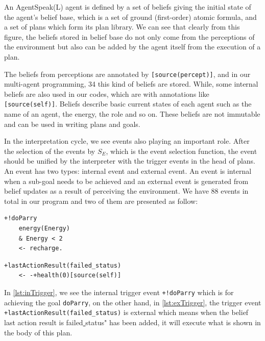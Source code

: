 An AgentSpeak(L) agent is defined by a set of beliefs giving the initial state of the agent's belief base, which is a set of ground (first-order) atomic formula, and a set of plans which form its plan library\cite{rafael_BDIAgent_2005}. We can see that clearly from this figure, the beliefs stored in belief base do not only come from the perceptions of the environment but also can be added by the agent itself from the execution of a plan.

The beliefs from perceptions are annotated by \texttt{[source(percept)]}, and in our multi-agent programming, 34 this kind of beliefs are stored. While, some internal beliefs are also used in our codes, which are with annotations like \texttt{[source(self)]}. Beliefs describe basic current states of each agent such as the name of an agent, the energy, the role and so on. These beliefs are not immutable and can be used in writing plans and goals.

In the interpretation cycle, we see events also playing an important role. After the selection of the events by $S_E$, which is the event selection function, the event should be unified by the interpreter with the trigger events in the head of plans. An event has two types: internal event and external event. An event is internal when a sub-goal needs to be achieved and an external event is generated from belief updates as a result of perceiving the environment. We have 88 events in total in our program and two of them are presented as follow:

\begin{lstlisting}[caption={Internal Trigger Event.},label={lst:inTrigger}]
  +!doParry
    energy(Energy)
    & Energy < 2
    <- recharge.
\end{lstlisting}

\begin{lstlisting}[caption={External Trigger Event.},label={lst:exTrigger}]
  +lastActionResult(failed_status)
    <- -+health(0)[source(self)]
\end{lstlisting}

In \autoref{lst:inTrigger}, we see the internal trigger event \texttt{+!doParry} which is for achieving the goal \texttt{doParry}, on the other hand, in \autoref{lst:exTrigger}, the trigger event \texttt{+lastActionResult(failed\_status)} is external which means when the belief last action result is failed\underline{ }status" has been added, it will execute what is shown in the body of this plan.

